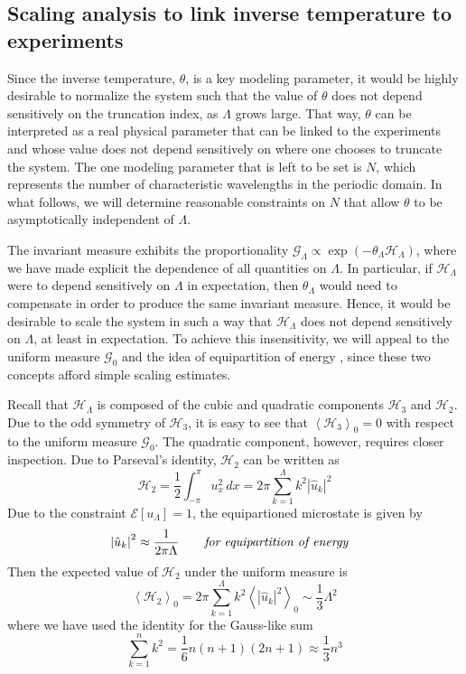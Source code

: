\documentclass[11pt]{article}
\newcommand{\abs}[1]{\left| #1 \right|}
\newcommand{\mean}[1]{\left< #1 \right>}
\newcommand{\dx}{\, dx}
\newcommand{\lamfac}{N}
\newcommand{\En}{\mathcal{E}}
\newcommand{\uhat}{\hat{u}}
\newcommand{\Ham}{\mathcal{H}}
\newcommand{\Hthree}{\Ham_{3}}
\newcommand{\Htwo}{\Ham_{2}}
\newcommand{\uL}{u_{\Lambda}}
\newcommand{\Gibbs}{\mathcal{G}}
\newcommand{\Gz}{\Gibbs_0}
\newcommand{\meanz}[1]{\mean{#1}_0}
\begin{document}
\subsection{Scaling analysis to link inverse temperature to experiments}

	Since the inverse temperature, $\theta$, is a key modeling parameter, it would be highly desirable to normalize the system such that the value of $\theta$ does not depend sensitively on the truncation index, as $\Lambda$ grows large. That way, $\theta$ can be interpreted as a real physical parameter that can be linked to the experiments and whose value does not depend sensitively on where one chooses to truncate the system. The one modeling parameter that is left to be set is $\lamfac$, which represents the number of characteristic wavelengths in the periodic domain. In what follows, we will determine reasonable constraints on $\lamfac$ that allow $\theta$ to be asymptotically independent of $\Lambda$.
	
	The invariant measure exhibits the proportionality $ \Gibbs_{\Lambda} \propto \exp(-\theta_{\Lambda} \Ham_{\Lambda})$, where we have made explicit the dependence of all quantities on $\Lambda$. In particular, if $\Ham_{\Lambda}$ were to depend sensitively on $\Lambda$ in expectation, then $\theta_{\Lambda}$ would need to compensate in order to produce the same invariant measure. Hence, it would be desirable to scale the system in such a way that $\Ham_{\Lambda}$ does not depend sensitively on $\Lambda$, at least in expectation. 
To achieve this insensitivity, we will appeal to the uniform measure $\Gz$ and the idea of equipartition of energy \cite{abramov2003}, since these two concepts afford simple scaling estimates.

Recall that $\Ham_{\Lambda}$ is composed of the cubic and quadratic components $\Hthree$ and $\Htwo$. Due to the odd symmetry of $\Hthree$, it is easy to see that $\meanz{\Hthree} = 0$ with respect to the uniform measure $\Gz$. The quadratic component, however, requires closer inspection. Due to Parseval's identity, $\Htwo$ can be written as
\begin{equation}
\Htwo = \frac{1}{2} \int_{-\pi}^{\pi} u_x^2 \dx = 2 \pi \sum_{k=1}^{\Lambda} k^2 \abs{\uhat_k}^2
\end{equation}
Due to the constraint $\En[\uL] = 1$, the equipartioned microstate is given by 
\begin{align}
&\abs{\uhat_k}^2 \approx \frac{1}{2 \pi \Lambda}	 \qquad \mbox{\em for equipartition of energy}
\end{align}
Then the expected value of $\Htwo$ under the uniform measure is
\begin{equation}
\label{HtwoExpect}
\mean{\Htwo}_0 = 2 \pi \sum_{k=1}^{\Lambda} {k}^ 2 \mean{\abs{\uhat_k}^2}_0 \sim \frac{1}{3} \Lambda^2
\end{equation}
where we have used the identity for the Gauss-like sum
\begin{equation}
\sum_{k=1}^{n} {k}^ 2 = \frac{1}{6} n(n+1)(2n+1) \approx \frac{1}{3} n^3
\end{equation}
\end{document}
